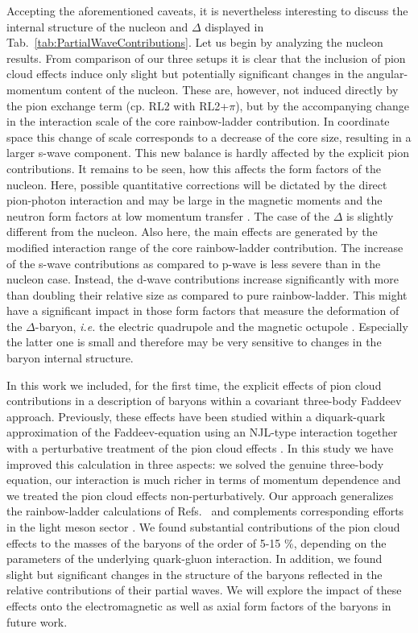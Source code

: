 Accepting the aforementioned caveats, it is nevertheless interesting to 
discuss the internal structure of the nucleon and $\Delta$ displayed in 
Tab.~\ref{tab:PartialWaveContributions}. Let us begin by analyzing 
the nucleon results. From comparison of our three setups it is clear 
that the inclusion of pion cloud effects induce only slight but potentially
significant changes in the angular-momentum content of the nucleon. These
are, however, not induced directly by the pion exchange term (cp. RL2 with
RL2+$\pi$), but by the accompanying change in the interaction scale of the
core rainbow-ladder contribution. In coordinate space this change of scale 
corresponds to a decrease of the core size, resulting in a larger s-wave 
component. This new balance is hardly affected by the explicit pion contributions.
It remains to be seen, how this affects the form factors of the nucleon.
Here, possible quantitative corrections will be dictated by the direct 
pion-photon interaction and may be large in the magnetic moments and the neutron
form factors at low momentum transfer \cite{Eichmann:2011vu}.
The case of the $\Delta$ is slightly different from the nucleon. Also here, the
main effects are generated by the modified interaction range of the core
rainbow-ladder contribution. The increase of the s-wave contributions as compared
to p-wave is less severe than in the nucleon case. Instead, the d-wave contributions
increase significantly with more than doubling their relative size as compared to
pure rainbow-ladder. This might have a significant impact in those form factors 
that measure the deformation of the $\Delta$-baryon, {\it i.e.} the electric quadrupole 
and the magnetic octupole \cite{Sanchis-Alepuz:2013iia}. Especially the latter 
one is small and therefore may be very sensitive to changes in the baryon internal 
structure.


In this work we included, for the first time, the explicit effects of pion cloud contributions 
in a description of baryons within a covariant three-body Faddeev approach. Previously,
these effects have been studied within a diquark-quark approximation of the Faddeev-equation
using an NJL-type interaction together with a perturbative treatment of the pion cloud effects 
\cite{Ishii:1998tw}.
In this study we have improved this calculation in three aspects: we solved the
genuine three-body equation, our interaction is much richer in terms of momentum dependence
and we treated the pion cloud effects non-perturbatively. Our approach generalizes the rainbow-ladder 
calculations of Refs.~\cite{Eichmann:2009qa,Eichmann:2009en,SanchisAlepuz:2011jn}
and complements corresponding efforts in the light meson sector 
\cite{Fischer:2007ze,Fischer:2008sp,Fischer:2008wy}. We found substantial 
contributions of the pion cloud effects to the masses of the baryons of 
the order of 5-15 \%, depending on the parameters of the underlying quark-gluon interaction.
In addition, we found slight but significant changes in the structure 
of the baryons reflected in the relative contributions of their partial waves.
We will explore the impact of these effects onto the electromagnetic 
as well as axial form factors of the baryons in future work.